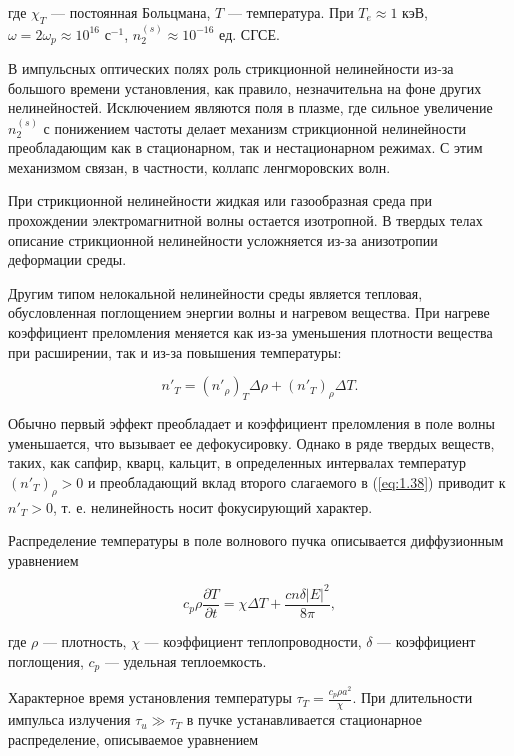 \documentclass[a4paper, 12pt]{article}
\begin{document}
где \(\chi_T\) — постоянная Больцмана, \(T\) — температура. При \(T_e \approx 1\) кэВ, \(\omega = 2 \omega_p \approx 10^{16}\) с\(^{-1}\), \( n_2^{(s)} \approx 10^{-16} \) ед. СГСЕ.

В импульсных оптических полях роль стрикционной нелинейности из-за большого времени установления, как правило, незначительна на фоне других нелинейностей. Исключением являются поля в плазме, где сильное увеличение \(n_2^{(s)}\) с понижением частоты делает механизм стрикционной нелинейности преобладающим как в стационарном, так и нестационарном режимах. С этим механизмом связан, в частности, коллапс ленгморовских волн.

При стрикционной нелинейности жидкая или газообразная среда при прохождении электромагнитной волны остается изотропной. В твердых телах описание стрикционной нелинейности усложняется из-за анизотропии деформации среды.

Другим типом нелокальной нелинейности среды является тепловая, обусловленная поглощением энергии волны и нагревом вещества. При нагреве коэффициент преломления меняется как из-за уменьшения плотности вещества при расширении, так и из-за повышения температуры:

\begin{equation}
n'_T = (n'_\rho)_T \Delta \rho + (n'_T)_\rho \Delta T.
\label{eq:1.38}
\end{equation}

Обычно первый эффект преобладает и коэффициент преломления в поле волны уменьшается, что вызывает ее дефокусировку. Однако в ряде твердых веществ, таких, как сапфир, кварц, кальцит, в определенных интервалах температур \((n'_T)_\rho > 0\) и преобладающий вклад второго слагаемого в (\ref{eq:1.38}) приводит к \(n'_T > 0\), т. е. нелинейность носит фокусирующий характер.

Распределение температуры в поле волнового пучка описывается диффузионным уравнением

\begin{equation}
c_p \rho \frac{\partial T}{\partial t} = \chi \Delta T + \frac{c n \delta |E|^2}{8\pi},
\label{eq:1.39}
\end{equation}

где \(\rho\) — плотность, \(\chi\) — коэффициент теплопроводности, \(\delta\) — коэффициент поглощения, \(c_p\) — удельная теплоемкость.

Характерное время установления температуры \(\tau_T = \frac{c_p \rho a^2}{\chi}\). При длительности импульса излучения \(\tau_u \gg \tau_T\) в пучке устанавливается стационарное распределение, описываемое уравнением
\end{document}

